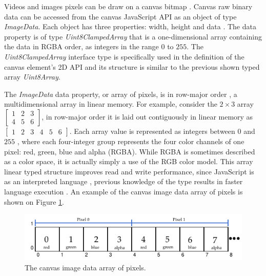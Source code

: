  Videos and images pixels can be draw on a canvas bitmap \cite{Canvas2013}. Canvas raw binary data can be accessed from the canvas JavaScript \cite{International2009} API as an object of type \textit{ImageData}. Each object has three properties: width, height and data \cite{Canvas2013,MDN2013}. The data property is of type \textit{Uint8ClampedArray} \cite{TypedArray2013} that is a one-dimensional array containing the data in RGBA \cite{Gonzalez2007} order, as integers in the range $0$ to $255$. The \textit{Uint8ClampedArray} interface type is specifically used in the definition of the canvas element's 2D API and its structure is  similar to the previous shown typed array \textit{Uint8Array}.

The \textit{ImageData} data property, or array of pixels, is in row-major order \cite{Canvas2013,MDN2013}, a multidimensional array in linear memory. For example, consider the $2\times3$ array $\begin{bmatrix}
1 & 2 & 3\\
4 & 5 & 6
\end{bmatrix}$, in row-major order it is laid out contiguously in linear memory as $\begin{bmatrix}
1 & 2 & 3 & 4 & 5 & 6
\end{bmatrix}$. Each array value is represented as integers between $0$ and $255$ \cite{Canvas2013,MDN2013}, where each four-integer group represents the four color channels of one pixel: red, green, blue and alpha (RGBA). While RGBA \cite{Gonzalez2007} is sometimes described as a color space, it is actually simply a use of the RGB color model. This array linear typed structure improves read and write performance, since JavaScript \cite{International2009} is as an interpreted language \cite{MDN2013}, previous knowledge of the type results in faster language execution \cite{TypedArray2013}. An example of the canvas image data array of pixels is shown on Figure \ref{figure:imagedata_array}.

\begin{figure}[!htb]
  \centering
  \includegraphics[width=\linewidth]{chapters/basic_concepts/imagedata_array.pdf}
  \caption{The canvas image data array of pixels.}
  \label{figure:imagedata_array}
\end{figure}

